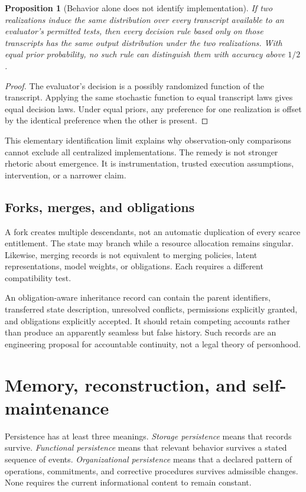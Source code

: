 \documentclass[11pt,letterpaper]{article}
\theoremstyle{plain}
\newtheorem{proposition}{Proposition}[section]
\theoremstyle{definition}
\theoremstyle{remark}
\begin{document}
\begin{proposition}[Behavior alone does not identify implementation]\label{prop:identifiability}
If two realizations induce the same distribution over every transcript available to an evaluator's permitted tests, then every decision rule based only on those transcripts has the same output distribution under the two realizations. With equal prior probability, no such rule can distinguish them with accuracy above $1/2$.
\end{proposition}
\begin{proof}
The evaluator's decision is a possibly randomized function of the transcript. Applying the same stochastic function to equal transcript laws gives equal decision laws. Under equal priors, any preference for one realization is offset by the identical preference when the other is present.
\end{proof}

This elementary identification limit explains why observation-only comparisons cannot exclude all centralized implementations. The remedy is not stronger rhetoric about emergence. It is instrumentation, trusted execution assumptions, intervention, or a narrower claim.

\subsection{Forks, merges, and obligations}
A fork creates multiple descendants, not an automatic duplication of every scarce entitlement. The state may branch while a resource allocation remains singular. Likewise, merging records is not equivalent to merging policies, latent representations, model weights, or obligations. Each requires a different compatibility test.

An obligation-aware inheritance record can contain the parent identifiers, transferred state description, unresolved conflicts, permissions explicitly granted, and obligations explicitly accepted. It should retain competing accounts rather than produce an apparently seamless but false history. Such records are an engineering proposal for accountable continuity, not a legal theory of personhood.

\section{Memory, reconstruction, and self-maintenance}\label{sec:memory}
Persistence has at least three meanings. \emph{Storage persistence} means that records survive. \emph{Functional persistence} means that relevant behavior survives a stated sequence of events. \emph{Organizational persistence} means that a declared pattern of operations, commitments, and corrective procedures survives admissible changes. None requires the current informational content to remain constant.
\end{document}
